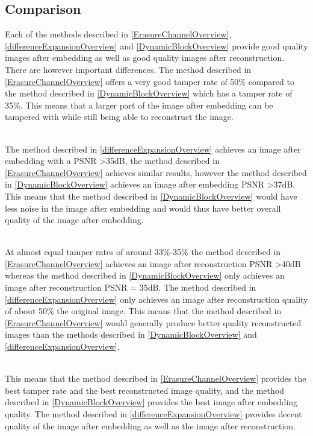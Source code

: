\documentclass[12pt]{article}
\begin{document}
\subsection{Comparison}
\label{litStudyCamparison}
Each of the methods described in \ref{ErasureChannelOverview}, \ref{differenceExpansionOverview} and \ref{DynamicBlockOverview} provide good quality images after embedding as well as good quality images after reconstruction.
There are however important differences.
The method described in \ref{ErasureChannelOverview} offers a very good tamper rate of 50\% compared to the method described in \ref{DynamicBlockOverview} which has a tamper rate of 35\%.
This means that a larger part of the image after embedding can be tampered with while still being able to reconstruct the image.

\hspace{0pt} \\
The method described in \ref{differenceExpansionOverview} achieves an image after embedding with a PSNR \textgreater 35dB, the method described in \ref{ErasureChannelOverview} achieves similar results, however the method described in \ref{DynamicBlockOverview} achieves an image after embedding PSNR \textgreater 37dB.
This means that the method described in \ref{DynamicBlockOverview} would have less noise in the image after embedding and would thus have better overall quality of the image after embedding.

\hspace{0pt} \\
At almost equal tamper rates of around 33\%-35\% the method described in \ref{ErasureChannelOverview} achieves an image after reconstruction PSNR \textgreater 40dB whereas the method described in \ref{DynamicBlockOverview} only achieves an image after reconstruction PSNR = 35dB.
The method described in \ref{differenceExpansionOverview} only achieves an image after reconstruction quality of about 50\% the original image.
This means that the method described in \ref{ErasureChannelOverview} would generally produce better quality reconstructed images than the methods described in \ref{DynamicBlockOverview} and \ref{differenceExpansionOverview}.

\hspace{0pt} \\
This means that the method described in \ref{ErasureChannelOverview} provides the best tamper rate and the best reconstructed image quality, and the method described in \ref{DynamicBlockOverview} provides the best image after embedding quality.
The method described in \ref{differenceExpansionOverview} provides decent quality of the image after embedding as well as the image after reconstruction.
\end{document}
